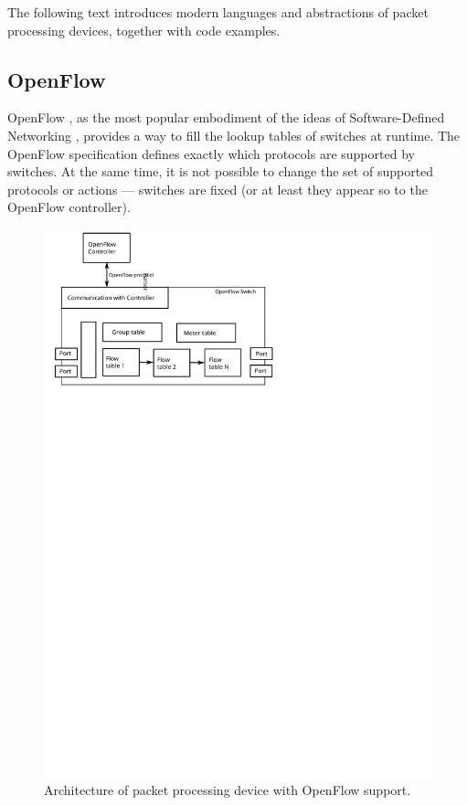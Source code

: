 The following text introduces modern languages and abstractions of packet processing devices, together with code examples.

\subsection{OpenFlow}
OpenFlow \cite{openflow}, as the most popular embodiment of the ideas of Software-Defined Networking \cite{SDNSpec},
provides a way to fill the lookup tables of switches at runtime.
The OpenFlow specification defines exactly which protocols are supported by switches. 
At the same time, it is not possible to change the set of supported protocols or actions --- switches are fixed 
(or at least they appear so to the OpenFlow controller).

\begin{figure}[b]
    \centering
    \includegraphics[scale=0.75]{chapters/pic/OpenFlowConcept}
    \caption{Architecture of packet processing device with OpenFlow support.}
    \label{fig:openflow_processing}
\end{figure}

